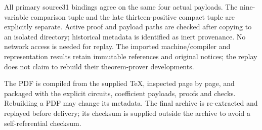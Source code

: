 All primary source31 bindings agree on the same four actual payloads.
The nine-variable comparison tuple and the late thirteen-positive compact
tuple are explicitly separate. Active proof
and payload paths are checked after copying to an isolated directory;
historical metadata is identified as inert provenance. No network access
is needed for replay. The imported machine/compiler and representation
results retain immutable references and original notices; the replay does
not claim to rebuild their theorem-prover developments.

The PDF is compiled from the supplied TeX, inspected page by page, and
packaged with the explicit circuits, coefficient payloads, proofs and
checks. Rebuilding a PDF may change its metadata. The final archive is
re-extracted and replayed before delivery; its checksum is supplied outside
the archive to avoid a self-referential checksum.
